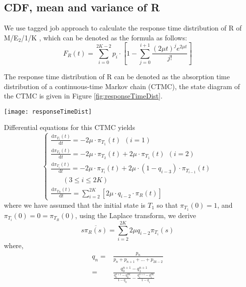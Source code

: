 \documentclass[10pt,journal,letterpaper,compsoc]{IEEEtran}
\newcommand\du{\mathrm{d}}
\begin{document}
\subsection{CDF, mean and variance of R} %
\label{subsec:CDFofR}
We use tagged job approach to calculate the response time distribution of
R of M/E$_2$/1/K \cite{ChScience:KSTrivedi2001PS},
which can be denoted as the formula as follows:
\begin{equation}
\label{equ:eq17}
F_R(t)=\sum_{i=0}^{2K-2}p_i\cdot \left[ 1-\sum_{j=0}^{i+1}\frac{(2\mu t)^je^{2\mu t}}{j!} \right]
\end{equation}

The response time distribution of R can be denoted as the absorption time
distribution of a continuous-time Markov chain (CTMC), the state diagram
of the CTMC is given in Figure \ref{fig:responseTimeDist}.

\begin{figure*}[htb]
\centering
\texttt{[image: responseTimeDist]}
\caption{The state diagram of time to absorption of R}
\label{fig:responseTimeDist}
\end{figure*}

Differential equations for this CTMC yields
\begin{equation}
\label{equ:eq18}
  \begin{cases}
    \frac{\du\pi_{T_1}(t)}{\du t}=-2\mu\cdot\pi_{T_1}(t)~~(i=1) \\
    \frac{\du\pi_{T_2}(t)}{\du t}=-2\mu\cdot\pi_{T_2}(t)+2\mu\cdot\pi_{T_1}(t)~~(i=2) \\
    \frac{\du\pi_{T_i}(t)}{\du t}=-2\mu\cdot\pi_{T_i}(t)+2\mu\cdot(1-q_{i-3})\cdot\pi_{T_{i-1}}(t) \\
    ~~~~~~~~(3\leq i\leq 2K) \\
    \frac{\du\pi_{T_R}(t)}{\du t}=\sum_{i=2}^{2K}[2\mu\cdot q_{i-2}\cdot \pi_R(t)]
  \end{cases}
\end{equation}
where we have assumed that the initial state is $T_1$
so that $\pi_{T_1}(0)=1$, and $\pi_{T_i}(0)=0=\pi_{T_R}(0)$,
using the Laplace transform, we derive
\begin{equation}
\label{equ:eq19}
s\overline{\pi_R(s)}=\sum_{i=2}^{2K}2\mu q_{i-2}\pi_{T_i}(s)
\end{equation}
where,
\begin{equation}
\label{equ:eq20}
  \begin{split}
    q_n=&\frac{p_n}{p_n+p_{n+1}+\ldots+p_{2k-2}} \\
       =&\frac{q_0^{n+1}-q_1^{n+1}}{\frac{q_0^{n+1}-q_0^{2K}}{1-q_0}-\frac{q_1^{n+1}-q_1^{2K}}{1-q_1}}
  \end{split}
\end{equation}
\end{document}
